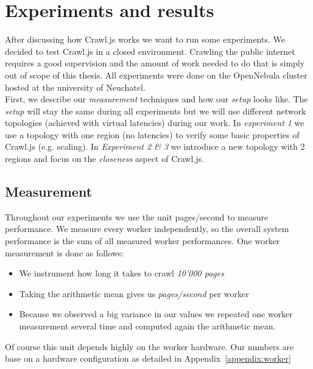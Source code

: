 
\chapter{Experiments and results} %

\label{Chapter5} %


After discussing how Crawl.js works we want to run some experiments. We decided to test Crawl.js in a closed environment. Crawling the public internet requires a good supervision and the amount of work needed to do that is simply out of scope of this thesis. All experiments were done on the OpenNebula cluster hosted at the university of Neuchatel.
\\
First, we describe our \emph{measurement} techniques and how our \emph{setup} looks like. The \emph{setup} will stay the same during all experiments but we will use different network topologies (achieved with virtual latencies) during our work. In \emph{experiment 1} we use a topology with one region (no latencies) to verify some basic properties of Crawl.js (e.g. scaling). In \emph{Experiment 2 \& 3} we introduce a new topology with 2 regions and focus on the \emph{closeness} aspect of Crawl.js.

\section{Measurement}
Throughout our experiments we use the unit pages/second to measure performance. We measure every worker independently, so the overall system performance is the sum of all measured worker performances. One worker measurement is done as follows:
\begin{itemize}
  \item We instrument how long it takes to crawl \emph{10'000 pages}
  \item Taking the arithmetic mean gives us \emph{pages/second} per worker
  \item Because we observed a big variance in our values we repeated one worker measurement several time and computed again the arithmetic mean.
\end{itemize}
Of course this unit depends highly on the worker hardware. Our numbers are base on a hardware configuration as detailed in Appendix~\ref{appendix:worker}

